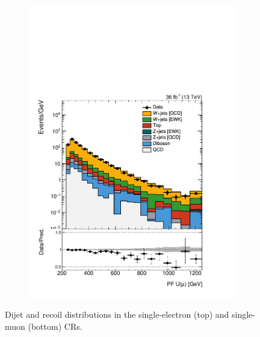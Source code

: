 \begin{figure}[]
\begin{center}
\begin{subfigure}[t]{0.24\textwidth}
            \includegraphics[width=\textwidth]{figures/vbf/prefit/singlemuon_pfUWmag_logy.pdf}
        \end{subfigure}
        \caption{Dijet and recoil distributions in the single-electron (top) and single-muon (bottom) CRs.}
        \label{fig:vbf:wcr}
    \end{center}
\end{figure}


